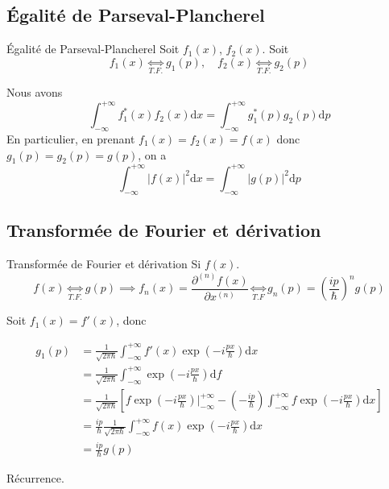 \subsection{Égalité de Parseval-Plancherel} %
\label{sub:Égalité de Parseval-Plancherel}

\begin{Prop}{Égalité de Parseval-Plancherel}{}
Soit $f_1(x)$, $f_2(x)$. Soit 
\[
  f_1(x) \underset{T.F.}{\iff} g_1(p), \quad f_2(x) \underset{T.F.}{\iff} g_2(p)
\]

Nous avons 
\begin{equation}
  \boxed{\displaystyle\int_{- \infty}^{+ \infty} f_1 ^{*}(x) f_2(x) \mathrm{d} x = \displaystyle\int_{- \infty}^{+ \infty} g_1 ^{*}(p) g_2(p) \mathrm{d} p}
  \label{eq:Parseval-Plancherel}
\end{equation}
En particulier, en prenant $f_1(x) = f_2(x) = f(x)$ donc $g_1(p) = g_2(p) = g(p)$, on a 
\[
  \int_{- \infty}^{ + \infty} |f(x)| ^{2} \mathrm{d} x = \int_{- \infty}^{ + \infty} |g(p)| ^{2} \mathrm{d} p
\]
\end{Prop}
 
\subsection{Transformée de Fourier et dérivation} %

\begin{Prop}{Transformée de Fourier et dérivation}{}
Si $f(x)$. 
\begin{equation}
  f(x) \underset{T.F.}{\iff} g(p) \implies f_n(x) = \frac{\partial ^{(n) }f(x)}{\partial x ^{(n)}} \underset{T.F}{\iff} g_n(p) = \left( \frac{ip}{\hbar}  \right) ^{n} g(p)
  \label{eq:2}
\end{equation}
\end{Prop}

\begin{myproof}{}{}
Soit $f_1(x) = f'(x)$, donc 

\begin{align*}
  g_1(p) &= \frac{1}{\sqrt{2 \pi \hbar}}  \displaystyle\int_{- \infty}^{+\infty} f'(x) \exp(-i \frac{p x}{\hbar} ) \mathrm{d}x \\
         &= \frac{1}{\sqrt{2 \pi \hbar}}  \displaystyle\int_{- \infty}^{+\infty}  \exp(-i \frac{p x}{\hbar} ) \mathrm{d}f \\
         &= \frac{1}{\sqrt{2 \pi \hbar}}  \left[ f \exp\left( - i \frac{p x}{\hbar} \right)| _{- \infty} ^{+ \infty} - \left( - \frac{ip}{\hbar}  \right) \int_{- \infty}^{+\infty} f \exp \left( - i \frac{p x}{\hbar}  \right)\mathrm{d}x\right] \\ 
         &=  \frac{i p }{\hbar}  \frac{1}{\sqrt{2 \pi \hbar}} \int_{- \infty}^{+\infty} f(x) \exp \left( -i \frac{p x}{\hbar}  \right) \mathrm{d} x \\ 
         &= \frac{ip}{\hbar}  g(p)
\end{align*}

Récurrence.
\end{myproof}

